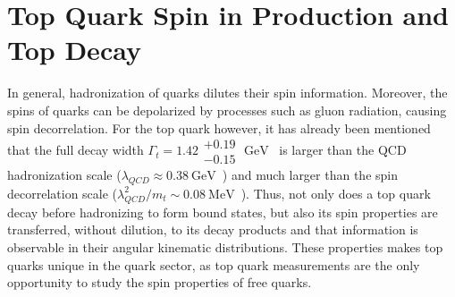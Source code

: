 \section{Top Quark Spin in \ttbar Production and Top Decay}
In general, hadronization of quarks dilutes their spin information.
Moreover, the spins of quarks can be depolarized by processes such as gluon radiation, causing spin decorrelation.
For the top quark however, it has already been mentioned that the full decay width $\Gamma_t = 1.42 \substack{+0.19 \\ -0.15} \; \si{\GeV}$~\cite{bib:PDG} is larger than the QCD hadronization scale ($\lambda_{QCD} \approx \SI{0.38}{\GeV}$~\cite{Groote_1998}) and much larger than the spin decorrelation scale ($\lambda_{QCD}^2/m_t \sim \SI{0.08}{\MeV}$~\cite{Stelzer_1996}).
Thus, not only does a top quark decay before hadronizing to form bound states, but also its spin properties are transferred, without dilution, to its decay products and that information is observable in their angular kinematic distributions.
These properties makes top quarks unique in the quark sector, as top quark measurements are the only opportunity to study the spin properties of free quarks.

